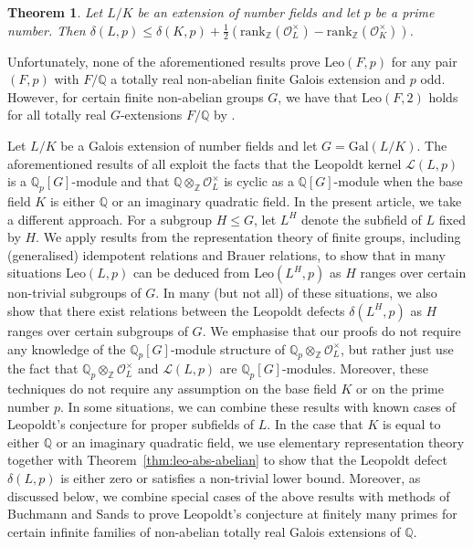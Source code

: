 \documentclass[12pt]{amsart}
\theoremstyle{plain}
\newtheorem{theorem}{Theorem}[section]
\theoremstyle{remark}
\theoremstyle{definition}
\newcommand{\Z}{\mathbb{Z}}
\newcommand{\Q}{\mathbb{Q}}
\newcommand{\Gal}{\mathrm{Gal}}
\newcommand{\Leo}{\mathrm{Leo}}
\numberwithin{equation}{section}
\begin{document}
\begin{theorem}\cite{MR4705615}
Let $L/K$ be an extension of number fields and let $p$ be a prime number. 
Then 
$\delta(L,p) \leq \delta(K,p) + \frac{1}{2}(\mathrm{rank}_{\Z} (\mathcal{O}_{L}^{\times})- \mathrm{rank}_{\Z} (\mathcal{O}_{K}^{\times}))$.
\end{theorem}

Unfortunately, none of the aforementioned results prove $\Leo(F,p)$ for any pair $(F,p)$ 
with $F/\Q$ a totally real non-abelian finite Galois extension and $p$ odd.
However, for certain finite non-abelian groups $G$, we have that $\Leo(F,2)$ holds for all totally real $G$-extensions $F/\Q$ by \cite[Theorem~3]{MR659620}.

Let $L/K$ be a Galois extension of number fields and let $G=\Gal(L/K)$.
The aforementioned results of \cite{MR659620,MR769790,MR1004134,MR1087978} all exploit the 
facts that the Leopoldt kernel $\mathcal{L}(L,p)$ is a $\Q_{p}[G]$-module and that 
$\Q \otimes_{\Z} \mathcal{O}_{L}^{\times}$ is cyclic as a $\Q[G]$-module
when the base field $K$ is either $\Q$ or an imaginary quadratic field.
In the present article, we take a different approach. 
For a subgroup $H \leq G$, let $L^{H}$ denote the subfield of $L$ fixed by $H$.
We apply results from the representation theory of finite groups, 
including (generalised) idempotent relations and Brauer relations, 
to show that in many situations $\Leo(L,p)$ can be deduced from $\Leo(L^{H},p)$ 
as $H$ ranges over certain non-trivial subgroups of $G$. 
In many (but not all) of these situations, we also show that there exist
relations between the Leopoldt defects $\delta(L^{H},p)$ 
as $H$ ranges over certain subgroups of $G$. 
We emphasise that our proofs do not require any knowledge of the
$\Q_{p}[G]$-module structure of $\Q_{p} \otimes_{\Z} \mathcal{O}_{L}^{\times}$, 
but rather just use the fact that $\Q_{p} \otimes_{\Z} \mathcal{O}_{L}^{\times}$ and 
$\mathcal{L}(L,p)$ are $\Q_{p}[G]$-modules. 
Moreover, these techniques do not require any assumption on the base field $K$ or on the prime number $p$. 
In some situations, we can combine these results with known cases of Leopoldt's conjecture
for proper subfields of $L$. 
In the case that $K$ is equal to either $\Q$ or an imaginary quadratic field, we use elementary representation theory together with Theorem~\ref{thm:leo-abs-abelian}
to show that the Leopoldt defect $\delta(L,p)$ is either zero or satisfies a non-trivial lower bound.
Moreover, as discussed below, we combine special cases of the above results 
with methods of Buchmann and Sands \cite{MR958040} to prove Leopoldt's conjecture
at finitely many primes for certain infinite families of non-abelian totally real Galois extensions of
$\Q$.
\end{document}
